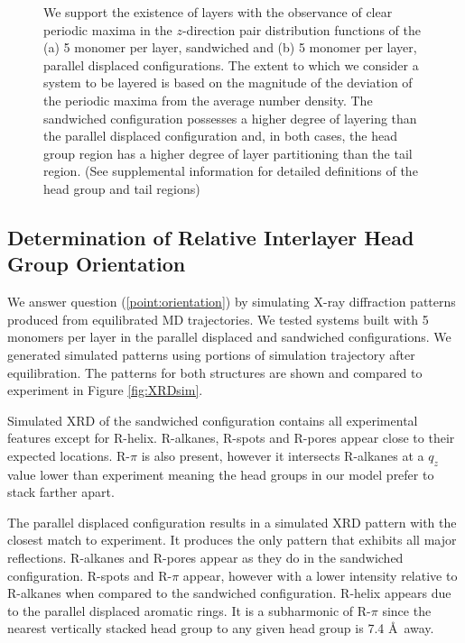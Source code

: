 \documentclass{article}
\begin{document}
\begin{figure}
\begin{subfigure}{0.45\textwidth}
                \caption{}\label{fig:zdf_offset}
        \end{subfigure}
	\caption{We support the existence of layers with the observance of
		clear periodic maxima in the $z$-direction pair distribution functions of the
		(a) 5 monomer per layer, sandwiched and (b) 5 monomer per layer, parallel
		displaced configurations. The extent to which we consider a system to be
		layered is based on the magnitude of the deviation of the periodic maxima from
		the average number density. The sandwiched configuration possesses a higher
		degree of layering than the parallel displaced configuration and, in both
		cases, the head group region has a higher degree of layer partitioning than the
		tail region. (See supplemental information for detailed definitions of the head
		group and tail regions)}\label{fig:zdf}
  \end{figure}

  \subsection{Determination of Relative Interlayer Head Group Orientation}

  We answer question (\ref{point:orientation}) by simulating X-ray diffraction
  patterns produced from equilibrated MD trajectories. We tested systems built
  with 5 monomers per layer in the parallel displaced and sandwiched
  configurations. We generated simulated patterns using portions of simulation
  trajectory after equilibration. The patterns for both structures are shown and
  compared to experiment in Figure \ref{fig:XRDsim}.

  Simulated XRD of the sandwiched configuration contains all experimental
  features except for R-helix. R-alkanes, R-spots and R-pores appear close to their
  expected locations. R-$\pi$ is also present, however it intersects R-alkanes at
  a $q_z$ value lower than experiment meaning the head groups in our model prefer 
  to stack farther apart. 

  The parallel displaced configuration results in a simulated XRD pattern with
  the closest match to experiment. It produces the only pattern that exhibits all
  major reflections. R-alkanes and R-pores appear as they do in the sandwiched
  configuration. R-spots and R-$\pi$ appear, however with a lower intensity
  relative to R-alkanes when compared to the sandwiched configuration. R-helix
  appears due to the parallel displaced aromatic rings. It is a subharmonic of
  R-$\pi$ since the nearest vertically stacked head group to any given head group
  is 7.4 \AA~away. 
\end{document}
